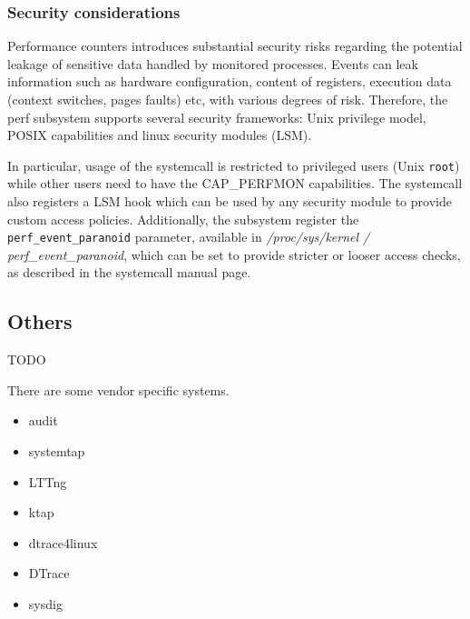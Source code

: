 \subsubsection*{Security considerations}

Performance counters introduces substantial security risks regarding the
potential leakage of sensitive data handled by monitored processes. Events can
leak information such as hardware configuration, content of registers, execution
data (context switches, pages faults) etc, with various degrees of risk.
Therefore, the perf subsystem supports several security frameworks: Unix
privilege model, POSIX capabilities and linux security modules (LSM).

In particular, usage of the systemcall is restricted to privileged users (Unix
\verb|root|) while other users need to have the CAP\_PERFMON capabilities. The
systemcall also registers a LSM hook which can be used by any security module to
provide custom access policies. Additionally, the subsystem register the
\verb|perf_event_paranoid| parameter, available in \textit{ /proc/sys/kernel /
perf\_event\_paranoid}, which can be set to provide stricter or looser access
checks, as described in the systemcall manual page.

\subsection{Others}

TODO

There are some vendor specific systems.

\begin{itemize}

  \item audit
  \item systemtap
  \item LTTng
  \item ktap
  \item dtrace4linux
  \item DTrace
  \item sysdig

\end{itemize}
